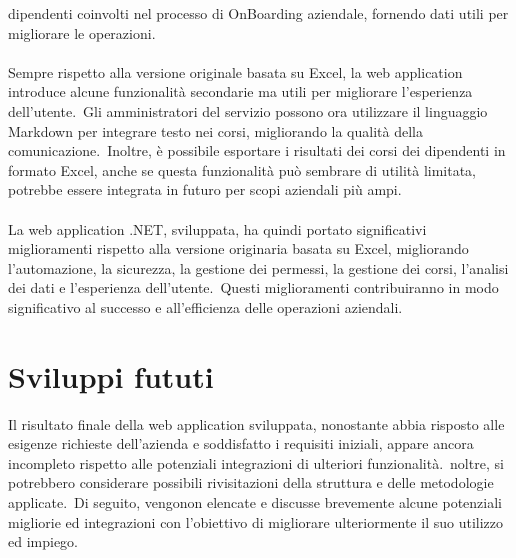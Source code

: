 dipendenti coinvolti nel processo di OnBoarding aziendale, fornendo dati utili per migliorare le operazioni.
\\ \\
Sempre rispetto alla versione originale basata su Excel, la web application introduce alcune funzionalità secondarie 
ma utili per migliorare l'esperienza dell'utente.\ Gli amministratori del servizio possono ora utilizzare il linguaggio 
Markdown per integrare testo nei corsi, migliorando la qualità della comunicazione.\ Inoltre, è possibile esportare i risultati dei corsi 
dei dipendenti in formato Excel, anche se questa funzionalità può sembrare di utilità limitata, potrebbe essere integrata 
in futuro per scopi aziendali più ampi.
\\ \\
La web application .NET, sviluppata, ha quindi portato significativi miglioramenti rispetto alla versione originaria basata su Excel, 
migliorando l'automazione, la sicurezza, la gestione dei permessi, la gestione dei corsi, l'analisi dei dati e 
l'esperienza dell'utente.\ Questi miglioramenti contribuiranno in modo significativo al successo e all'efficienza 
delle operazioni aziendali.
%
\section{Sviluppi fututi}\label{sec:cap_sec_subsec}
Il risultato finale della web application sviluppata, nonostante abbia risposto alle esigenze richieste dell'azienda e 
soddisfatto i requisiti iniziali, appare ancora incompleto rispetto alle potenziali integrazioni di ulteriori funzionalità.\ 
noltre, si potrebbero considerare possibili rivisitazioni della struttura e delle metodologie applicate.\ Di seguito, 
vengonon elencate e discusse brevemente alcune potenziali migliorie ed integrazioni con l'obiettivo di migliorare 
ulteriormente il suo utilizzo ed impiego.
